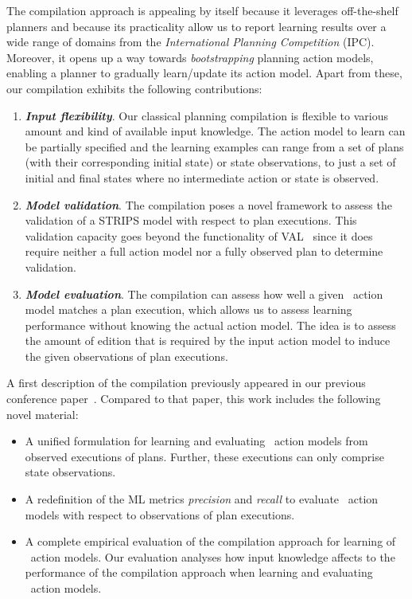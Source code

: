 The compilation approach is appealing by itself because it leverages off-the-shelf planners and because its practicality allow us to report learning results over a wide range of domains from the {\em International Planning Competition} (IPC). Moreover, it opens up a way towards \emph{bootstrapping} planning action models, enabling a planner to gradually learn/update its action model. Apart from these, our compilation exhibits the following contributions:
\begin{enumerate}
\item {\bf\em Input flexibility}. Our classical planning compilation is flexible to various amount and kind of available input knowledge. The action model to learn can be partially specified and the learning examples can range from a set of plans (with their corresponding initial state) or state observations, to just a set of initial and final states where no intermediate action or state is observed. %

\item {\bf\em Model validation}. The compilation poses a novel framework to assess the validation of a STRIPS model with respect to plan executions. This validation capacity goes beyond the functionality of VAL~\cite{howey2004val} since it does require neither a full action model nor a fully observed plan to determine validation. 
  
\item {\bf\em Model evaluation}. The compilation can assess how well a given \strips\ action model matches a plan execution, which allows us to assess learning performance without knowing the actual action model. The idea is to assess the amount of edition that is required by the input action model to induce the given observations of plan executions. 
\end{enumerate}

A first description of the compilation previously appeared in our previous conference paper~\cite{aineto2018learning}. Compared to that paper, this work includes the following novel material:
\begin{itemize}
\item A unified formulation for learning and evaluating \strips\ action models from observed executions of plans. Further, these executions can only comprise state observations.
\item A redefinition of the ML metrics {\em precision} and {\em recall} to evaluate \strips\ action models with respect to observations of plan executions.
\item A complete empirical evaluation of the compilation approach for learning of \strips\ action models. Our evaluation analyses how input knowledge affects to the performance of the compilation approach when learning and evaluating \strips\ action models. 
\end{itemize}

